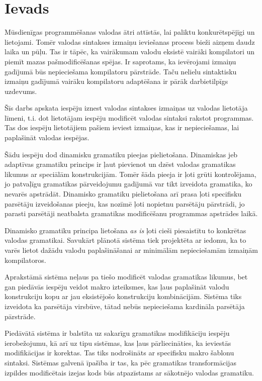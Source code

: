 \section{\label{s:introduction}Ievads}

Mūsdienīgas programmēšanas valodas ātri attīstās, lai paliktu konkurētspējīgi un lietojami. Tomēr valodas sintakses izmaiņu ieviešanas process bieži aizņem daudz laika un pūļu. Tas ir tāpēc, ka vairākumam valodu eksistē vairāki kompilatori un piemīt mazas pašmodificēšanas spējas. Ir saprotams, ka ievērojami izmaiņu gadījumā būs nepieciešama kompilatoru pārstrāde. Taču nelielu sintaktisku izmaiņu gadījumā vairāku kompilatoru adaptēšana ir pārāk darbietilpīgs uzdevums.

Šīs darbs apskata iespēju iznest valodas sintakses izmaiņas uz valodas lietotāja līmeni, t.i. dot lietotājam iespēju modificēt valodas sintaksi rakstot programmas. Tas dos iespēju lietotājiem pašiem ieviest izmaiņas, kas ir nepieciešamas, lai paplašināt valodas iespējas.

Šādu iespēju dod dinamisku gramatiku pieejas pielietošana. Dinamiskas jeb adaptīvas gramatiku princips ir ļaut pievienot un dzēst valodas gramatikas likumus ar speciālām konstrukcijām. Tomēr šāda pieeja ir ļoti grūti kontrolējama, jo patvaļīgu gramatikas pārveidojumu gadījumā var tikt izveidota gramatika, ko nevarēs apstrādāt. Dinamisko gramatiku pielietošana arī prasa ļoti specifisku parsētāju izveidošanas pieeju, kas nozīmē ļoti nopietnu parsētāju pārstrādi, jo parasti parsētāji neatbalsta gramatikas modificēšanu programmas apstrādes laikā.

Dinamisko gramatiku principa lietošana \emph{as is} ļoti cieši piesaistītu to konkrētas valodas gramatikai.
Savukārt plānotā sistēma tiek projektēta ar iedomu, ka to varēs lietot dažādu valodu paplašināšanai ar minimālām nepieciešamām izmaiņām kompilatoros.

Aprakstāmā sistēma neļaus pa tiešo modificēt valodas gramatikas likumus, bet gan piedāvās iespēju veidot makro izteiksmes, kas ļaus paplašināt valodu konstrukciju kopu ar jau eksistējošo konstrukciju kombinācijām. Sistēma tiks izveidota ka parsētāja virsbūve, tātad nebūs nepieciešama kardināla parsētāja pārstrāde.

Piedāvātā sistēma ir balstīta uz sakarīgu gramatikas modifikāciju iespēju ierobežojumu, kā arī uz tipu sistēmas, kas ļaus pārliecināties, ka ieviestās modifikācijas ir korektas. Tas tiks nodrošināts ar specifisku makro šablonu sintaksi. Sistēmas galvenā īpašība ir tas, ka pēc gramatikas transformācijas izpildes modificētais izejas kods būs atpazīstams ar sākotnējo valodas gramatiku.

